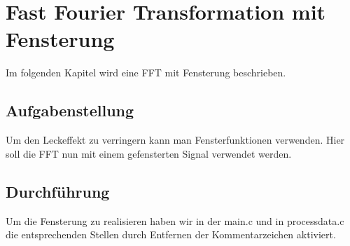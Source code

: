 \chapter{Fast Fourier Transformation mit Fensterung}\label{CFFTmF}
Im folgenden Kapitel wird eine FFT mit Fensterung beschrieben.
\section{Aufgabenstellung}\label{TFFTmF}
Um den Leckeffekt zu verringern kann man Fensterfunktionen verwenden. Hier soll die FFT nun mit einem gefensterten Signal verwendet werden.
\section{Durchführung}\label{DFFTmF}
Um die Fensterung zu realisieren haben wir in der 
main.c und in process\textunderscore data.c 
die entsprechenden Stellen durch Entfernen der Kommentarzeichen aktiviert.\\

